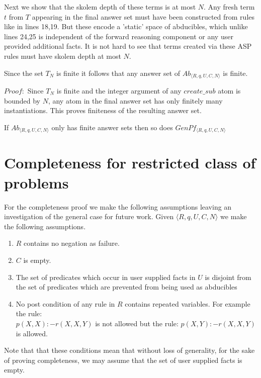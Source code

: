 \documentclass[sigconf]{acmart}
\begin{document}
Next we show that the skolem depth of these terms is at most $N$. Any fresh term $t$ from $T$ appearing in the final answer set must have been constructed from rules like in lines 18,19. But these encode a 'static' space of abducibles, which unlike lines 24,25 is independent of the forward reasoning component or any user provided additional facts. It is not hard to see that terms created via these ASP rules must have skolem depth at most $N$. 
\begin{lemma}
Since the set $T_{N}$ is finite it follows that any answer set of $Ab_{\langle R,q,U,C,N \rangle}$ is finite.\\
\end{lemma}

$Proof:$ Since $T_{N}$ is finite and the integer argument of any $create\_sub$ atom is bounded by $N$, any atom in the final answer set has only finitely many instantiations. This proves finiteness of the resulting answer set. 
\begin{lemma}
If $Ab_{\langle R,q,U,C,N\rangle}$ only has finite answer sets then so does $GenPf_{\langle R,q,U,C,N\rangle}$
\end{lemma}

\section{Completeness for restricted class of problems}\label{sec:completeness}
For the completeness proof we make the following assumptions leaving an investigation of the general case for future work. Given $\langle R,q,U,C,N\rangle$ we make the following assumptions.

\begin{enumerate}
\item $R$ contains no negation as failure.
\item $C$ is empty.
\item The set of predicates which occur in user supplied facts in $U$ is
  disjoint from the set of predicates which are prevented from being used as
  abducibles
\item No post condition of any rule in $R$ contains repeated variables. For example the rule:\\
$p(X,X):-r(X,X,Y)$ is not allowed but the rule: $p(X,Y):-r(X,X,Y)$ is allowed.
\end{enumerate}

Note that that these conditions mean that without loss of generality, for the sake of proving completeness, we may assume that the set of user supplied facts is empty.
\end{document}
